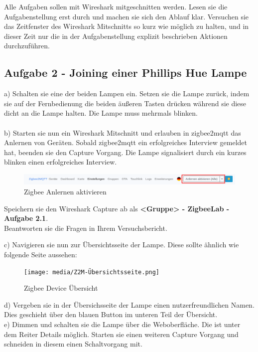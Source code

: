 \begin{Hinweis}
    Alle Aufgaben sollen mit Wireshark mitgeschnitten werden. Lesen sie die Aufgabenstellung erst durch und machen sie sich den Ablauf klar. Versuchen sie das 
    Zeitfenster des Wireshark Mitschnitts so kurz wie möglich zu halten, und in dieser Zeit nur die in der Aufgabenstellung explizit beschrieben Aktionen durchzuführen.
\end{Hinweis}

\subsection{Aufgabe 2 - Joining einer Phillips Hue Lampe}
a) Schalten sie eine der beiden Lampen ein. Setzen sie die Lampe zurück, indem sie auf der Fernbedienung die beiden äußeren Tasten drücken während sie diese dicht an die Lampe halten. Die Lampe muss mehrmals blinken.\\\\
b) Starten sie nun ein Wireshark Mitschnitt und erlauben in zigbee2mqtt das Anlernen von Geräten. Sobald zigbee2mqtt ein erfolgreiches Interview gemeldet hat, beenden sie
den Capture Vorgang. Die Lampe signalisiert durch ein kurzes blinken einen erfolgreiches Interview.

\begin{figure}[H]
    \centering
    \includegraphics[width=1\textwidth]{media/Z2M-Anlernen.png}
    \caption{Zigbee Anlernen aktivieren}
\end{figure}

\begin{Aufgabe}
    Speichern sie den Wireshark Capture ab als \textbf{\grqq <Gruppe> - ZigbeeLab - Aufgabe 2.1\grqq{}}. \\
    Beantworten sie die Fragen in Ihrem Versuchsbericht.
\end{Aufgabe}

c) Navigieren sie nun zur Übersichtsseite der Lampe. Diese sollte ähnlich wie folgende Seite aussehen:

\begin{figure}[H]
    \centering
    \texttt{[image: media/Z2M-Übersichtsseite.png]}
    \caption{Zigbee Device Übersicht}
\end{figure}

d) Vergeben sie in der Übersichsseite der Lampe einen nutzerfreundlichen Namen. Dies geschieht über den blauen Button im unteren Teil der Übersicht.\\
e) Dimmen und schalten sie die Lampe über die Weboberfläche. Die ist unter dem Reiter \grqq Details\grqq{} möglich. Starten sie einen weiteren Capture Vorgang und
schneiden in diesem einen Schaltvorgang mit.

